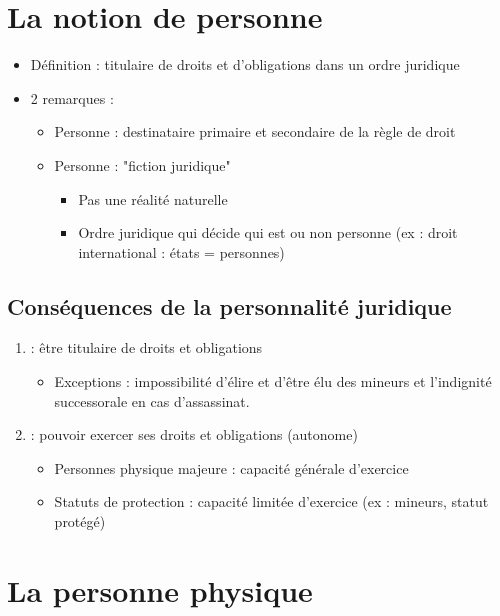 \section{La notion de personne}
\begin{itemize}
    \item Définition : titulaire de droits et d'obligations dans un ordre juridique
    \item 2 remarques :
    \begin{itemize}
        \item Personne : destinataire primaire et secondaire de la règle de droit
        \item Personne : "fiction juridique"
        \begin{itemize}
            \item Pas une réalité naturelle
            \item Ordre juridique qui décide qui est ou non personne (ex : droit international : états = personnes)
        \end{itemize}
    \end{itemize}
\end{itemize}

\subsection{Conséquences de la personnalité juridique}

\begin{enumerate}
    \item {} : être titulaire de droits et obligations
    \begin{itemize}
        \item Exceptions : impossibilité d'élire et d'être élu des mineurs et l'indignité successorale en cas d'assassinat.
    \end{itemize}
    \item {} : pouvoir exercer ses droits et obligations (autonome)
    \begin{itemize}
        \item Personnes physique majeure : capacité générale d'exercice
        \item Statuts de protection : capacité limitée d'exercice (ex : mineurs, statut protégé)
    \end{itemize}
\end{enumerate}

\section{La personne physique}

